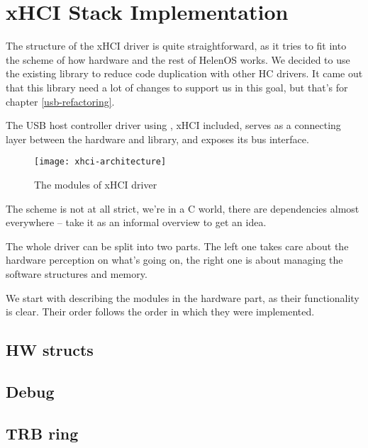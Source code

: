 \chapter{xHCI Stack Implementation}

The structure of the xHCI driver is quite straightforward, as it tries to fit
into the scheme of how hardware and the rest of HelenOS works. We decided to
use the existing library  to reduce code duplication with
other HC drivers. It came out that this library need a lot of changes to
support us in this goal, but that's for chapter \ref{usb-refactoring}.

The USB host controller driver using , xHCI included, serves as
a connecting layer between the hardware and library, and exposes its bus
interface.

\begin{figure}[h]
	\centering
	\texttt{[image: xhci-architecture]}
	\caption{The modules of xHCI driver}
\end{figure}

The scheme is not at all strict, we're in a C world, there are dependencies
almost everywhere -- take it as an informal overview to get an idea.

The whole driver can be split into two parts. The left one takes care about the
hardware perception on what's going on, the right one is about managing the
software structures and memory.

We start with describing the modules in the hardware part, as their
functionality is clear. Their order follows the order in which they were
implemented.

\section{HW structs}


\section{Debug}


\section{TRB ring}

